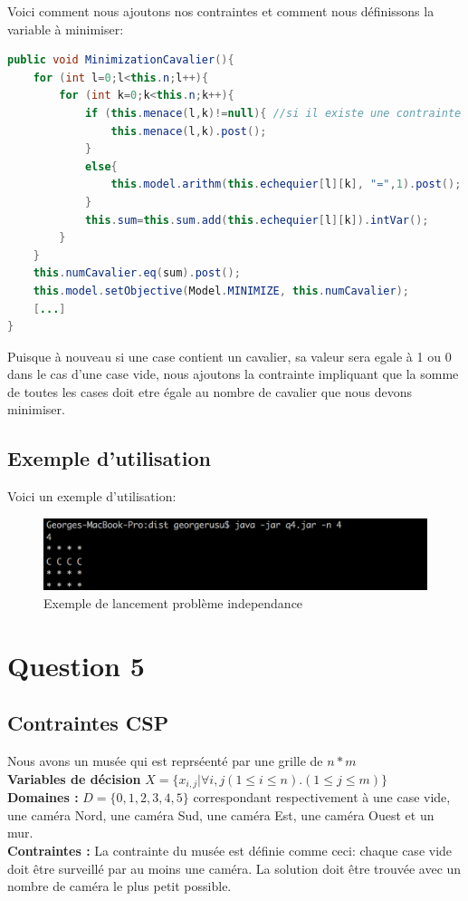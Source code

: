 \documentclass[a4paper,10pt]{article}
\begin{document}
Voici comment nous ajoutons nos contraintes et comment nous définissons la variable à minimiser:
\begin{lstlisting}[language=Java,basicstyle=\tiny]
public void MinimizationCavalier(){
	for (int l=0;l<this.n;l++){
		for (int k=0;k<this.n;k++){
			if (this.menace(l,k)!=null){ //si il existe une contrainte
				this.menace(l,k).post();
			}
			else{
				this.model.arithm(this.echequier[l][k], "=",1).post(); //sinon c'est une case occupe ->cavalier
			}
			this.sum=this.sum.add(this.echequier[l][k]).intVar();
		}	
	}
	this.numCavalier.eq(sum).post();
	this.model.setObjective(Model.MINIMIZE, this.numCavalier);
	[...]
}
\end{lstlisting}

Puisque à nouveau si une case contient un cavalier, sa valeur sera egale à 1 ou 0 dans le cas d'une case vide, nous ajoutons la contrainte impliquant que la somme de toutes les cases doit etre égale au nombre de cavalier que nous devons minimiser.

\subsection{Exemple d'utilisation}
Voici un exemple d'utilisation:
\begin{figure}[!h]
  \includegraphics[width=\linewidth]{img/q4.png}
  \caption{Exemple de lancement problème independance}
\end{figure}

\section{Question 5}
\subsection{Contraintes CSP}
	Nous avons un musée qui est reprséenté par une grille de $n * m$\\
	\textbf {Variables de décision} $ X = \{x_{i,j} | \forall i,j (1 \leq i \leq n).(1 \leq j \leq m)\}$\\
	\textbf{Domaines : } $ D = \{0, 1, 2, 3, 4, 5\} $ correspondant respectivement à une case vide, une caméra Nord, une caméra Sud, une caméra Est, une caméra Ouest et un mur.\\
	\textbf{Contraintes : } La contrainte du musée est définie comme ceci: chaque case vide doit être surveillé par au moins une caméra. La solution doit être trouvée avec un nombre de caméra le plus petit possible.
\end{document}
